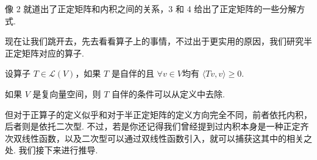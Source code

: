 像 2 就道出了正定矩阵和内积之间的关系，3 和 4 给出了正定矩阵的一些分解方式.

现在让我们跳开去，先去看看算子上的事情，不过出于更实用的原因，我们研究半正定矩阵对应的算子.

\begin{definition}[正算子] 
    设算子 $ T \in \mathcal{L}(V) $，如果 $ T $ 是自伴的且 $ \forall v \in V $均有 $ \langle Tv, v \rangle \geqslant 0 $.
\end{definition}

如果 $ V $ 是复向量空间，则 $ T $ 自伴的条件可以从定义中去除.

但对于正算子的定义似乎和对于半正定矩阵的定义方向完全不同，前者依托内积，后者则是依托二次型. 不过，若是你还记得我们曾经提到过内积本身是一种正定齐次双线性函数，以及二次型可以通过双线性函数引入，就可以捕获这其中的相关之处. 我们接下来进行推导.

